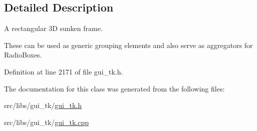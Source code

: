 \subsection{Detailed Description}
A rectangular 3\-D sunken frame. 

These can be used as generic grouping elements and also serve as aggregators for Radio\-Boxes. 

Definition at line 2171 of file gui\-\_\-tk.\-h.



The documentation for this class was generated from the following files\-:\begin{DoxyCompactItemize}
\item 
src/libs/gui\-\_\-tk/\hyperlink{gui__tk_8h}{gui\-\_\-tk.\-h}\item 
src/libs/gui\-\_\-tk/\hyperlink{gui__tk_8cpp}{gui\-\_\-tk.\-cpp}\end{DoxyCompactItemize}
